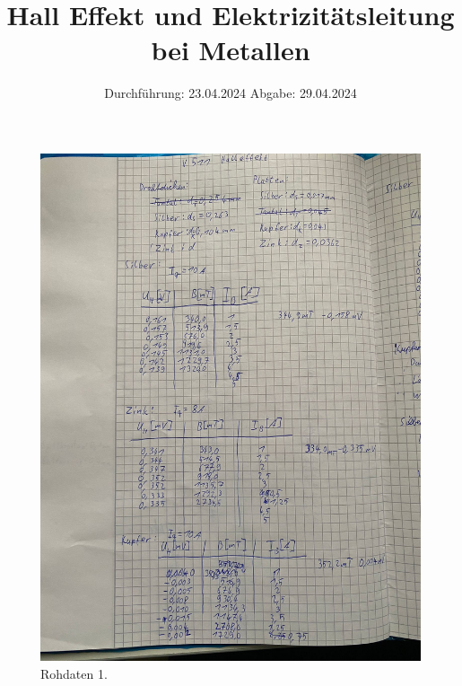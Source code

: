 

\subject{V511}
\title{Hall Effekt und Elektrizitätsleitung bei Metallen}
\date{%
  Durchführung: 23.04.2024
  \hspace{3em}
  Abgabe: 29.04.2024
}



\maketitle
\thispagestyle{empty}
\tableofcontents
\newpage






\printbibliography{}

\begin{figure}[H]
  \includegraphics[width=\textwidth, height=15cm]{Bilder/data1.jpg}
  \caption{Rohdaten 1.}
\end{figure}

